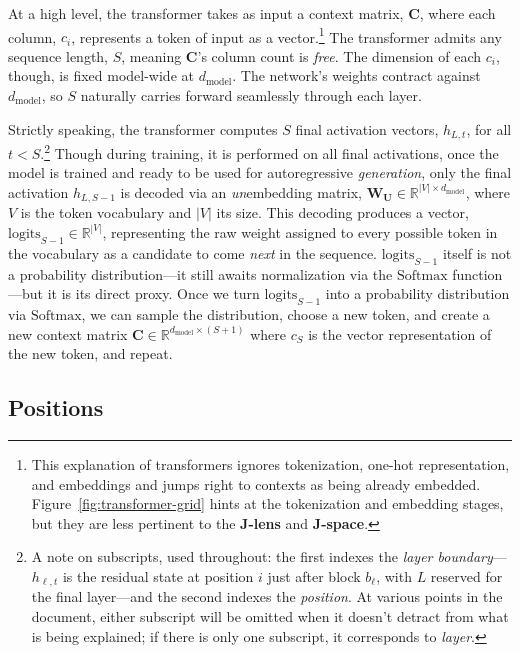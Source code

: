 \documentclass{article}
\newcommand{\logits}{\mathrm{logits}}
\newcommand{\smax}{\mathrm{Softmax}}
\newcommand{\dmodel}{d_{\text{model}}}
\begin{document}
At a high level, the transformer takes as input a context matrix, \(\mathbf{C}\), where each column, \(c_i\), represents a token of input as a vector.\footnote{This explanation of transformers ignores tokenization, one-hot representation, and embeddings and jumps right to contexts as being already embedded. Figure~\ref{fig:transformer-grid} hints at the tokenization and embedding stages, but they are less pertinent to the \textbf{J-lens} and \textbf{J-space}.} The transformer admits any sequence length, \(S\), meaning \(\mathbf{C}\)'s column count is \textit{free}. The dimension of each \(c_i\), though, is fixed model-wide at \(\dmodel\). The network's weights contract against \(\dmodel\), so \(S\) naturally carries forward seamlessly through each layer.

Strictly speaking, the transformer computes \(S\) final activation vectors, \(h_{L, t}\), for all \(t < S\).\footnote{A note on subscripts, used throughout: the first indexes the \textit{layer boundary}---\(h_{\ell, t}\) is the residual state at position \(i\) just after block \(b_\ell\), with \(L\) reserved for the final layer---and the second indexes the \textit{position}. At various points in the document, either subscript will be omitted when it doesn't detract from what is being explained; if there is only one subscript, it corresponds to \textit{layer}.} Though during training, it is performed on all final activations, once the model is trained and ready to be used for autoregressive \textit{generation}, only the final activation \(h_{L, S-1}\) is decoded via an \textit{un}embedding matrix, \(\mathbf{W_U} \in \mathbb{R}^{|V| \times \dmodel}\), where \(V\) is the token vocabulary and \(|V|\) its size. This decoding produces a vector, \(\logits_{S-1} \in \mathbb{R}^{|V|}\), representing the raw weight assigned to every possible token in the vocabulary as a candidate to come \textit{next} in the sequence. \(\logits_{S-1}\) itself is not a probability distribution---it still awaits normalization via the \(\smax\) function---but it is its direct proxy. Once we turn \(\logits_{S-1}\) into a probability distribution via \(\smax\), we can sample the distribution, choose a new token, and create a new context matrix $\mathbf{C} \in \mathbb{R}^{\dmodel \times (S+1)}$ where \(c_S\) is the vector representation of the new token, and repeat. 

\subsection{Positions}
\end{document}
